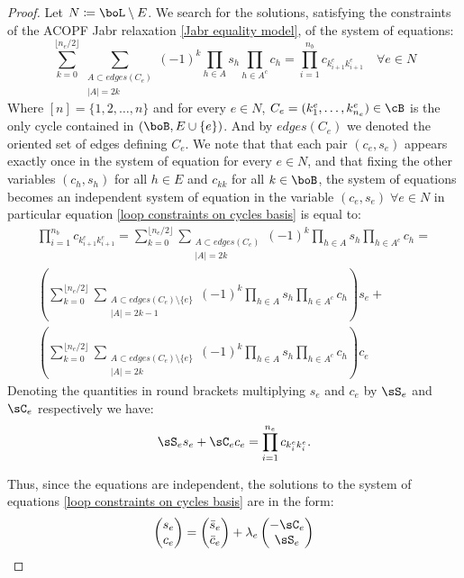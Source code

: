 \documentclass[11pt,a4paper,oneside,openany]{book}
\numberwithin{definition}{section}
\numberwithin{theorem}{section}
\numberwithin{problem}{section}
\begin{document}
\begin{proof}
Let $N \coloneqq \boL \setminus E$. We search for the solutions, satisfying the constraints of the ACOPF Jabr relaxation \ref{Jabr equality model},  of the system of equations:
\begin{equation} \label{loop constraints on cycles basis}
    \sum_{k = 0}^{\lfloor n_e/2 \rfloor}\sum_{\substack{A \subset edges(C_e)\\|A|=2k}}(-1)^k\prod_{h \in A}s_{h}\prod_{h \in A^c}c_{h}=\prod_{i=1}^{n_b}c_{k^e_{i+1}k^e_{i+1}} \quad \forall e \in N 
\end{equation}
Where $[n] = \{1,2,\ldots,n\}$ and for every $e \in N$, $C_e = (k^e_1,\ldots,k^e_{n_e}) \in\cB$ is the only cycle contained in \((\boB, E \cup \{e\})\). And by $edges(C_e)$ we denoted the oriented set of edges defining $C_e$.
We note that that each pair $(c_e,s_e)$ appears exactly once in the system of equation for every $e \in N$, and that fixing the other variables $(c_h,s_h)$ for all $h \in E$ and $c_{kk}$ for all $k \in \boB$, the system of equations becomes an independent system of equation in the variable $(c_e,s_e)\; \forall e \in N$ in particular equation \eqref{loop constraints on cycles basis} is equal to:
\begin{align}
     \prod_{i=1}^{n_b}c_{k^e_{i+1}k^e_{i+1}} = \sum_{k = 0}^{\lfloor n_e/2 \rfloor}\sum_{\substack{A \subset edges(C_e)\\|A|=2k}}(-1)^k\prod_{h \in A}s_{h}\prod_{h \in A^c}c_{h}  = \\      
      \left( \sum_{k = 0}^{\lfloor n_e/2 \rfloor}\sum_{\substack{A \subset edges(C_e) \setminus \{e\}\\|A|=2k-1}} (-1)^k \prod_{h \in A}s_{h}\prod_{h \in A^c}c_{h}\right) s_e + \\
      \left( \sum_{k = 0}^{\lfloor n_e/2 \rfloor}\sum_{\substack{A \subset edges(C_e)\setminus \{e\}\\|A|=2k}}(-1)^k\prod_{h \in A}s_{h}\prod_{h \in A^c}c_{h}\right) c_e 
\end{align}
Denoting the quantities in round brackets multiplying $s_e$ and $c_e$ by $\sS_e$ and $\sC_e$ respectively we have: 
\begin{equation}\label{param}
    \sS_e s_e + \sC_e  c_e = \prod_{i=1}^{n_e}c_{k^e_ik^e_i}.
\end{equation}

Thus, since the equations are independent, the solutions to the system of equations \ref{loop constraints on cycles basis} are in the form:
\begin{equation}
    \begin{pmatrix}
        s_e \\ c_e
    \end{pmatrix} 
    = \begin{pmatrix}
    \bar s_e \\ \bar c_e
\end{pmatrix}
    + \lambda_e 
    \begin{pmatrix}
        - \sC_e \\ \sS_e
    \end{pmatrix}
\end{equation}


\end{proof}
\end{document}
